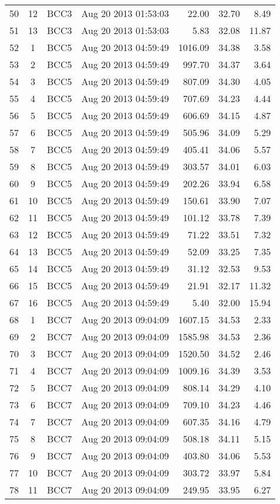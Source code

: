\documentclass{article}
\begin{document}
\begin{longtable}{ccllrrr}
50&12&BCC3&Aug 20 2013 01:53:03&22.00&32.70&8.49\\
51&13&BCC3&Aug 20 2013 01:53:03&5.83&32.08&11.87\\
\hline 
52&1&BCC5&Aug 20 2013 04:59:49&1016.09&34.38&3.58\\
53&2&BCC5&Aug 20 2013 04:59:49&997.70&34.37&3.64\\
54&3&BCC5&Aug 20 2013 04:59:49&807.09&34.30&4.05\\
55&4&BCC5&Aug 20 2013 04:59:49&707.69&34.23&4.44\\
56&5&BCC5&Aug 20 2013 04:59:49&606.69&34.15&4.87\\
57&6&BCC5&Aug 20 2013 04:59:49&505.96&34.09&5.29\\
58&7&BCC5&Aug 20 2013 04:59:49&405.41&34.06&5.57\\
59&8&BCC5&Aug 20 2013 04:59:49&303.57&34.01&6.03\\
60&9&BCC5&Aug 20 2013 04:59:49&202.26&33.94&6.58\\
61&10&BCC5&Aug 20 2013 04:59:49&150.61&33.90&7.07\\
62&11&BCC5&Aug 20 2013 04:59:49&101.12&33.78&7.39\\
63&12&BCC5&Aug 20 2013 04:59:49&71.22&33.51&7.32\\
64&13&BCC5&Aug 20 2013 04:59:49&52.09&33.25&7.35\\
65&14&BCC5&Aug 20 2013 04:59:49&31.12&32.53&9.53\\
66&15&BCC5&Aug 20 2013 04:59:49&21.91&32.17&11.32\\
67&16&BCC5&Aug 20 2013 04:59:49&5.40&32.00&15.94\\
\hline 
68&1&BCC7&Aug 20 2013 09:04:09&1607.15&34.53&2.33\\
69&2&BCC7&Aug 20 2013 09:04:09&1585.98&34.53&2.36\\
70&3&BCC7&Aug 20 2013 09:04:09&1520.50&34.52&2.46\\
71&4&BCC7&Aug 20 2013 09:04:09&1009.16&34.39&3.53\\
72&5&BCC7&Aug 20 2013 09:04:09&808.14&34.29&4.10\\
73&6&BCC7&Aug 20 2013 09:04:09&709.10&34.23&4.46\\
74&7&BCC7&Aug 20 2013 09:04:09&607.35&34.16&4.79\\
75&8&BCC7&Aug 20 2013 09:04:09&508.18&34.11&5.15\\
76&9&BCC7&Aug 20 2013 09:04:09&403.80&34.06&5.53\\
77&10&BCC7&Aug 20 2013 09:04:09&303.72&33.97&5.84\\
78&11&BCC7&Aug 20 2013 09:04:09&249.95&33.95&6.27\\

\end{longtable}
\end{document}
